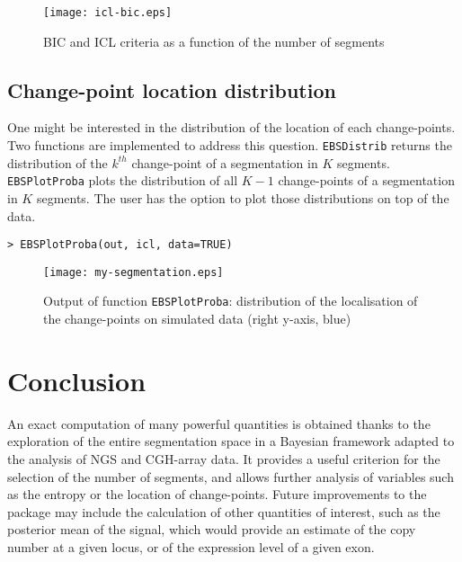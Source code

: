 \documentclass{bioinfo}
\begin{document}
\begin{methods}
\begin{verbatim}
\end{verbatim}


\begin{figure}[!h]%
\centerline{\texttt{[image: icl-bic.eps]}}
\caption{BIC and ICL criteria as a function of the number of segments} \label{fig:01}
\end{figure}






\subsection{Change-point location distribution}

One might be interested in the
distribution of the location of each change-points. Two functions are
implemented to address this question. \texttt{EBSDistrib} returns the
distribution of the $k^{th}$ change-point of a segmentation in $K$
segments. \texttt{EBSPlotProba} plots the distribution of all
$K\!-\!1$ change-points of a segmentation in $K$ segments. The user
has the option to plot those distributions on top of the data.
\begin{verbatim}
> EBSPlotProba(out, icl, data=TRUE)
\end{verbatim}

\begin{figure}[!h]%
\centerline{\texttt{[image: my-segmentation.eps]}}
\caption{Output of function \texttt{EBSPlotProba}: distribution of the localisation of the change-points on simulated data (right y-axis, blue)}\label{fig:02}
\end{figure}




\section{Conclusion}

An exact computation of many powerful quantities is obtained thanks to
the exploration of the entire segmentation space in a Bayesian
framework adapted to the analysis of NGS and CGH-array data.  It
provides a useful criterion for the selection of the number of
segments, and allows further analysis of variables such as the entropy
or the location of change-points.  Future improvements to the package
may include the calculation of other quantities of
interest, such as the posterior mean of the signal, which would
  provide an estimate of the copy number at a given locus, or of the
  expression level of a given exon.




\end{methods}
\end{document}

